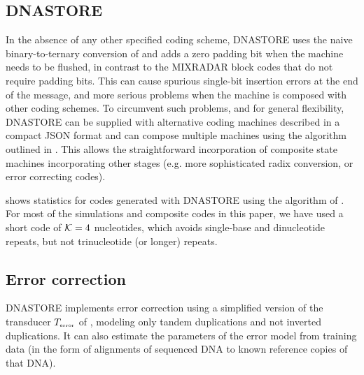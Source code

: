 \documentclass[english]{article}
\begin{document}

\subsection{DNASTORE}

In the absence of any other specified coding scheme,
DNASTORE uses the naive binary-to-ternary conversion of
 and adds a zero padding bit when the machine needs to be flushed,
in contrast to the MIXRADAR block codes that do not require padding bits.
This can cause spurious single-bit insertion errors at the end of the message, and more serious problems when the
machine is composed with other coding schemes.
To circumvent such problems, and for general flexibility,
DNASTORE can be supplied with alternative coding machines described in a compact JSON format
and can compose multiple machines using the algorithm outlined in .
This allows the straightforward incorporation of composite state machines incorporating other stages
(e.g. more sophisticated radix conversion, or error correcting codes).

 shows statistics for codes generated with DNASTORE
using the algorithm of .
For most of the simulations and composite codes in this paper, we have used a short code of ${\cal K}=4$ nucleotides,
which avoids single-base and dinucleotide repeats,
but not trinucleotide (or longer) repeats.

\subsection{Error correction}

DNASTORE implements error correction using a simplified version of the transducer $T_{\mbox{\tiny error}}$
of , modeling only tandem duplications and not inverted duplications.
It can also estimate the parameters of the error model from training data
(in the form of alignments of sequenced DNA to known reference copies of that DNA).
\end{document}
